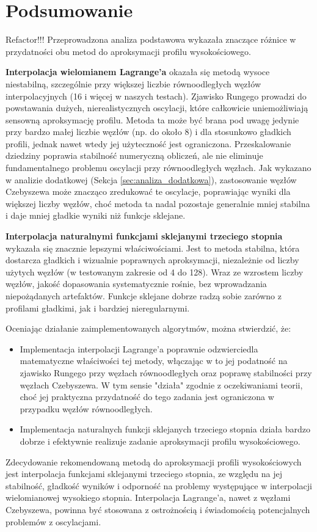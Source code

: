 \documentclass[11pt,a4paper]{article}
\begin{document}
\section{Podsumowanie}
Refactor!!!
\label{sec:podsumowanie}
Przeprowadzona analiza podstawowa wykazała znaczące różnice w przydatności obu metod do aproksymacji profilu wysokościowego.

\textbf{Interpolacja wielomianem Lagrange'a} okazała się metodą wysoce niestabilną, szczególnie przy większej liczbie równoodległych węzłów interpolacyjnych (16 i więcej w naszych testach). Zjawisko Rungego prowadzi do powstawania dużych, nierealistycznych oscylacji, które całkowicie uniemożliwiają sensowną aproksymację profilu. Metoda ta może być brana pod uwagę jedynie przy bardzo małej liczbie węzłów (np. do około 8) i dla stosunkowo gładkich profili, jednak nawet wtedy jej użyteczność jest ograniczona. Przeskalowanie dziedziny poprawia stabilność numeryczną obliczeń, ale nie eliminuje fundamentalnego problemu oscylacji przy równoodległych węzłach. Jak wykazano w analizie dodatkowej (Sekcja \ref{sec:analiza_dodatkowa}), zastosowanie węzłów Czebyszewa może znacząco zredukować te oscylacje, poprawiając wyniki dla większej liczby węzłów, choć metoda ta nadal pozostaje generalnie mniej stabilna i daje mniej gładkie wyniki niż funkcje sklejane.

\textbf{Interpolacja naturalnymi funkcjami sklejanymi trzeciego stopnia} wykazała się znacznie lepszymi właściwościami. Jest to metoda stabilna, która dostarcza gładkich i wizualnie poprawnych aproksymacji, niezależnie od liczby użytych węzłów (w testowanym zakresie od 4 do 128). Wraz ze wzrostem liczby węzłów, jakość dopasowania systematycznie rośnie, bez wprowadzania niepożądanych artefaktów. Funkcje sklejane dobrze radzą sobie zarówno z profilami gładkimi, jak i bardziej nieregularnymi.

Oceniając działanie zaimplementowanych algorytmów, można stwierdzić, że:
\begin{itemize}
    \item Implementacja interpolacji Lagrange'a poprawnie odzwierciedla matematyczne właściwości tej metody, włączając w to jej podatność na zjawisko Rungego przy węzłach równoodległych oraz poprawę stabilności przy węzłach Czebyszewa. W tym sensie "działa" zgodnie z oczekiwaniami teorii, choć jej praktyczna przydatność do tego zadania jest ograniczona w przypadku węzłów równoodległych.
    \item Implementacja naturalnych funkcji sklejanych trzeciego stopnia działa bardzo dobrze i efektywnie realizuje zadanie aproksymacji profilu wysokościowego.
\end{itemize}

Zdecydowanie rekomendowaną metodą do aproksymacji profili wysokościowych jest interpolacja funkcjami sklejanymi trzeciego stopnia, ze względu na jej stabilność, gładkość wyników i odporność na problemy występujące w interpolacji wielomianowej wysokiego stopnia. Interpolacja Lagrange'a, nawet z węzłami Czebyszewa, powinna być stosowana z ostrożnością i świadomością potencjalnych problemów z oscylacjami.
\end{document}
